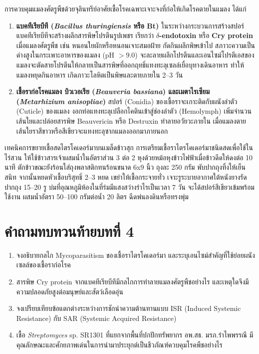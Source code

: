 การควบคุมแมลงศัตรูพืชด้วยจุลินทรีย์อาศัยเชื้อโรคเฉพาะเจาะจงที่ก่อให้เกิดโรคตายในแมลง ได้แก่
\begin{enumerate}
    \item \textbf{แบคทีเรียบีที (\textit{Bacillus thuringiensis} หรือ Bt)} ในระหว่างกระบวนการสร้างสปอร์ แบคทีเรียบีทีจะสร้างผลึกสารพิษโปรตีนรูปเพชร เรียกว่า \textbf{$\delta$-endotoxin} หรือ \textbf{Cry protein} เมื่อแมลงศัตรูพืช เช่น หนอนใยผักหรือหนอนเจาะสมอฝ้าย กัดกินผลึกพิษเข้าไป สภาวะความเป็นด่างสูงในกระเพาะอาหารของแมลง (pH $> 9.0$) จะละลายผลึกโปรตีนและเอนไซม์โปรตีเอสของแมลงจะตัดสายโปรตีนให้กลายเป็นสารพิษที่ออกฤทธิ์แทงทะลุเซลล์เยื่อบุทางเดินอาหาร ทำให้แมลงหยุดกินอาหาร เกิดภาวะโลหิตเป็นพิษและตายภายใน 2--3 วัน
    \item \textbf{เชื้อราก่อโรคแมลง บิวเวอเรีย (\textit{Beauveria bassiana}) และเมตาไรเซียม (\textit{Metarhizium anisopliae})} สปอร์ (Conidia) ของเชื้อราจะเกาะติดกับผนังลำตัว (Cuticle) ของแมลง งอกท่อแทงทะลุเปลือกไคตินเข้าสู่ช่องลำตัว (Hemolymph) เพิ่มจำนวนเส้นใยและปล่อยสารพิษ Beauvericin หรือ Destruxin ทำลายอวัยวะภายใน เมื่อแมลงตาย เส้นใยราสีขาวหรือสีเขียวจะแทงทะลุซากแมลงออกมาภายนอก
\end{enumerate}

\begin{agribox}{เทคนิคการขยายเชื้อสดไตรโคเดอร์มาบนเมล็ดข้าวสุก}
การเตรียมเชื้อราไตรโคเดอร์มาชนิดสดเพื่อใช้ในไร่สวน ให้ใช้ข้าวสารเจ้าผสมน้ำในอัตราส่วน 3 ต่อ 2 หุงด้วยหม้อหุงข้าวไฟฟ้าเมื่อข้าวดีดให้ดงต่อ 10 นาที ตักข้าวขณะยังร้อนใส่ถุงพลาสติกทนร้อนขนาด 6x9 นิ้ว ถุงละ 250 กรัม พับปากถุงทิ้งให้เย็นสนิท จากนั้นหยดหัวเชื้อบริสุทธิ์ 2--3 หยด เขย่าให้เชื้อกระจายทั่ว เจาะรูระบายอากาศใต้หนังยางรัดปากถุง 15--20 รู บ่มที่อุณหภูมิห้องในที่ร่มมีแสงสว่างรำไรเป็นเวลา 7 วัน จะได้สปอร์สีเขียวเข้มพร้อมใช้งาน ผสมน้ำอัตรา 50--100 กรัมต่อน้ำ 20 ลิตร ฉีดพ่นลงดินหรือทรงพุ่ม
\end{agribox}

\section*{คำถามทบทวนท้ายบทที่ 4}
\begin{enumerate}
    \item จงอธิบายกลไก Mycoparasitism ของเชื้อราไตรโคเดอร์มา และระบุเอนไซม์สำคัญที่ใช้ย่อยผนังเซลล์ของเชื้อราก่อโรค
    \item สารพิษ Cry protein จากแบคทีเรียบีทีมีกลไกการทำลายแมลงศัตรูพืชอย่างไร และเหตุใดจึงมีความปลอดภัยสูงต่อมนุษย์และสัตว์เลือดอุ่น
    \item จงเปรียบเทียบข้อแตกต่างระหว่างการชักนำความต้านทานแบบ ISR (Induced Systemic Resistance) กับ SAR (Systemic Acquired Resistance)
    \item เชื้อ \textit{Streptomyces} sp. SR1301 ที่แยกจากพื้นที่ปกปักทรัพยากร อพ.สธ. มรภ.รำไพพรรณี มีคุณลักษณะและศักยภาพเด่นในการนำมาประยุกต์เป็นชีวภัณฑ์ควบคุมโรคพืชอย่างไร
\end{enumerate}

\clearpage